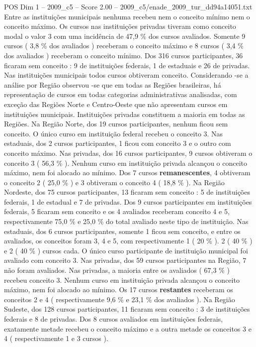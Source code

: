 \begin{textsample}{POS Dim 1 – 2009\_c5 – Score 2.00 – 2009\_c5/enade\_2009\_tur\_dd94a14051.txt}
Entre as instituições municipais nenhuma recebeu nem o conceito mínimo nem o conceito máximo.
Os cursos nas instituições privadas tiveram como conceito modal o valor 3 com uma incidência de 47,9 \% dos cursos avaliados.
Somente 9 cursos ( 3,8 \% dos avaliados ) receberam o conceito máximo e 8 cursos ( 3,4 \% dos avaliados ) receberam o conceito mínimo.
Dos 316 cursos participantes, 36 ficaram sem conceito : 9 de instituições federais, 1 de estaduais e 26 de privadas.
Nas instituições municipais todos cursos obtiveram conceito.
Considerando -se a análise por Região observou -se que em todas as Regiões brasileiras, há representação de cursos em todas categorias administrativas analisadas, com exceção das Regiões Norte e Centro-Oeste que não apresentam cursos em instituições municipais.
Instituições privadas constituem a maioria em todas as Regiões.
Na Região Norte, dos 19 cursos participantes, nenhum ficou sem conceito.
O único curso em instituição federal recebeu o conceito 3.
Nas estaduais, dos 2 cursos participantes, 1 ficou com conceito 3 e o outro com conceito máximo.
Nas privadas, dos 16 cursos participantes, 9 cursos obtiveram o conceito 3 ( 56,3 \% ).
Nenhum curso em instituição privada alcançou o conceito máximo, nem foi alocado ao mínimo.
Dos 7 cursos \textbf{remanescentes}, 4 obtiveram o conceito 2 ( 25,0 \% ) e 3 obtiveram o conceito 4 ( 18,8 \% ).
Na Região Nordeste, dos 75 cursos participantes, 13 ficaram sem conceito : 5 de instituições federais, 1 de estadual e 7 de privadas.
Dos 9 cursos participantes em instituições federais, 5 ficaram sem conceito e os 4 avaliados receberam conceito 4 e 5, respectivamente 75,0 \% e 25,0 \% do total avaliado neste tipo de instituição.
Nas estaduais, dos 6 cursos participantes, somente 1 ficou sem conceito, e entre os avaliados, os conceitos foram 3, 4 e 5, com respectivamente 1 ( 20 \% ). 2 ( 40 \% ) e 2 ( 40 \% ) cursos cada.
O único curso participante de instituição municipal foi avaliado com conceito 3.
Nas privadas, dos 59 cursos participantes na Região, 7 não foram avaliados.
Nas privadas, a maioria entre os avaliados ( 67,3 \% ) recebeu conceito 3.
Nenhum curso em instituição privada alcançou o conceito máximo, nem foi alocado ao mínimo.
Os 17 cursos \textbf{restantes} receberam os conceitos 2 e 4 ( respectivamente 9,6 \% e 23,1 \% dos avaliados ).
Na Região Sudeste, dos 128 cursos participantes, 11 ficaram sem conceito : 3 de instituições federais e 8 de privadas.
Dos 8 cursos avaliados em instituições federais, exatamente metade recebeu o conceito máximo e a outra metade os conceitos 3 e 4 ( respectivamente 1 e 3 cursos ).

\end{textsample}
